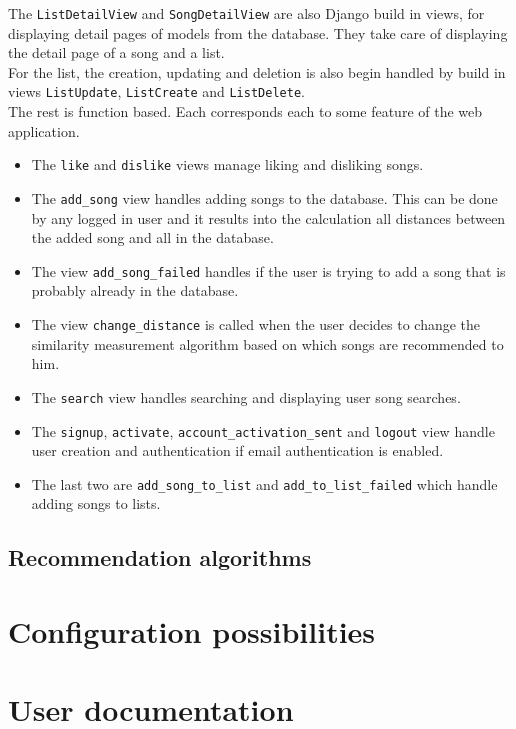 The \texttt{ListDetailView} and \texttt{SongDetailView} are also Django build in views, for displaying detail pages of models from the database. They take care of displaying the detail page of a song and a list. \\

For the list, the creation, updating and deletion is also begin handled by build in views \texttt{ListUpdate}, \texttt{ListCreate} and \texttt{ListDelete}. \\

The rest is function based. Each corresponds each to some feature of the web application. 
\begin{itemize}
\item The \texttt{like} and \texttt{dislike} views manage liking and disliking songs.
\item The \texttt{add\_song} view handles adding songs to the database. This can be done by any logged in user and it results into the calculation all distances between the added song and all in the database.
\item The view \texttt{add\_song\_failed} handles if the user is trying to add a song that is probably already in the database.
\item The view \texttt{change\_distance} is called when the user decides to change the similarity measurement algorithm based on which songs are recommended to him.
\item The \texttt{search} view handles searching and displaying user song searches. 
\item The \texttt{signup},  \texttt{activate}, \texttt{account\_activation\_sent} and \texttt{logout} view handle user creation and authentication if email authentication is enabled.
\item The last two are \texttt{add\_song\_to\_list} and \texttt{add\_to\_list\_failed} which handle adding songs to lists.
\end{itemize}
 
 \subsection{Recommendation algorithms}

\section{Configuration possibilities}
\section{User documentation}